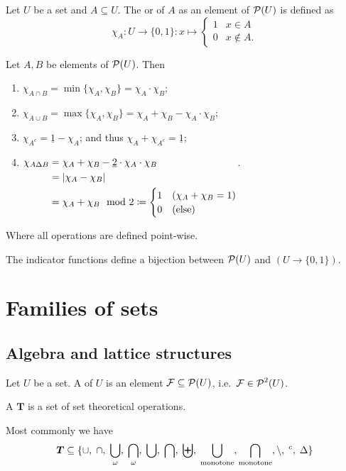 \begin{definition}
Let $U$ be a set and $A\subseteq U$. The  or  of $A$ as an element of $\operatorname{\mathcal{P}}(U)$ is defined as
\[ \chi_A: U\to \{0,1\}: x\mapsto \begin{cases}
1 & x\in A \\ 0 & x\notin A.
\end{cases} \]
\end{definition}
\begin{lemma}
Let $A,B$ be elements of $\operatorname{\mathcal{P}}(U)$. Then
\begin{enumerate}
\item $\chi_{A\cap B} = \min\{\chi_A,\chi_B\} = \chi_A\cdot \chi_B$;
\item $\chi_{A\cup B} = \max\{\chi_A,\chi_B\} = \chi_A + \chi_B - \chi_A\cdot \chi_B$;
\item $\chi_{A^c} = \underline{1}-\chi_A$; and thus $\chi_A + \chi_{A^c} = \underline{1}$;
\item $\chi_{A\Delta B} \begin{aligned}[t] &= \chi_A + \chi_B - \underline{2}\cdot\chi_A\cdot \chi_B \\
&= |\chi_A - \chi_B| \\
&= \chi_A + \chi_B \mod 2 \coloneqq \begin{cases}
1 & (\chi_A + \chi_B = 1) \\
0 & \text{(else)}
\end{cases}
\end{aligned}$.
\end{enumerate}
Where all operations are defined point-wise.
\end{lemma}

\begin{proposition}
The indicator functions define a bijection between $\operatorname{\mathcal{P}}(U)$ and $(U\to \{0,1\})$.
\end{proposition}

\section{Families of sets}
\subsection{Algebra and lattice structures}
\begin{definition}
Let $U$ be a set. A  of $U$ is an element $\mathcal{F}\subseteq\operatorname{\mathcal{P}}(U)$, i.e.\ $\mathcal{F}\in\operatorname{\mathcal{P}}^2(U)$.

A  $\boldsymbol{T}$ is a set of set theoretical operations.
\end{definition}
Most commonly we have
\[ \boldsymbol{T} \subseteq \{\cup,\; \cap,\; \bigcup_\omega,\; \bigcap_\omega,\; \bigcup,\; \bigcap,\; \biguplus,\; \bigcup_\text{monotone}, \bigcap_\text{monotone}, \setminus,\; ^c,\; \mathbin{\Delta} \} \]

